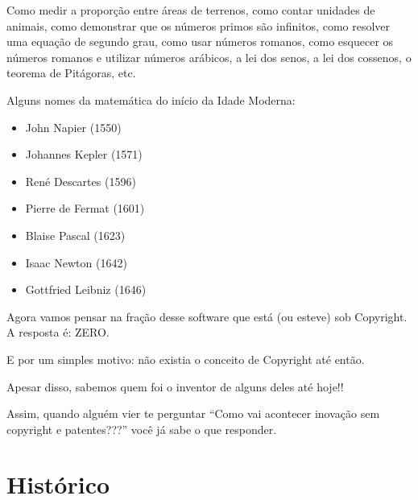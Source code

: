 \documentclass[serif,mathserif]{beamer}
\begin{document}
\begin{frame}
  Como medir a proporção entre áreas de terrenos, \pause como contar unidades de animais, \pause
  como demonstrar que os números primos são infinitos, \pause como resolver uma equação de
  segundo grau, \pause como usar números romanos, \pause como esquecer os números romanos e utilizar
  números arábicos, \pause a lei dos senos, \pause a lei dos cossenos, \pause o teorema de Pitágoras, \pause etc.\pause

  \vspace{2mm}
  Alguns nomes da matemática do início da Idade Moderna: \\
   \pause
  \begin{itemize}[<+->]
    \item John Napier (1550)
    \item Johannes Kepler (1571)
    \item René Descartes (1596)
    \item Pierre de Fermat (1601)
    \item Blaise Pascal (1623)
    \item Isaac Newton (1642)
    \item Gottfried Leibniz (1646)
  \end{itemize}

\end{frame}

\begin{frame}
  Agora vamos pensar na fração desse software que está (ou esteve) sob Copyright. \pause A resposta é: ZERO.\pause

  E por um simples motivo: não existia o conceito de Copyright até então. \pause

  Apesar disso, sabemos quem foi o inventor de alguns deles até hoje!! \pause

  \vspace{5mm} %
  Assim, quando alguém vier te perguntar ``Como vai acontecer inovação
  sem copyright e patentes???'' você já sabe o que responder.
\end{frame}


\section{Histórico}  %
\end{document}
